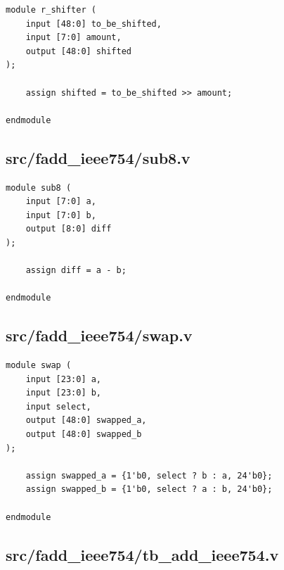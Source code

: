 \documentclass{article}
\begin{document}
\begin{lstlisting}
module r_shifter (
    input [48:0] to_be_shifted,
    input [7:0] amount,
    output [48:0] shifted
);

    assign shifted = to_be_shifted >> amount;

endmodule
\end{lstlisting}

\subsection{src/fadd\_ieee754/sub8.v}

\begin{lstlisting}
module sub8 (
    input [7:0] a,
    input [7:0] b,
    output [8:0] diff
);

    assign diff = a - b;

endmodule
\end{lstlisting}

\subsection{src/fadd\_ieee754/swap.v}

\begin{lstlisting}
module swap (
    input [23:0] a,
    input [23:0] b,
    input select,
    output [48:0] swapped_a,
    output [48:0] swapped_b
);

    assign swapped_a = {1'b0, select ? b : a, 24'b0};
    assign swapped_b = {1'b0, select ? a : b, 24'b0};

endmodule
\end{lstlisting}

\subsection{src/fadd\_ieee754/tb\_add\_ieee754.v}
\end{document}
